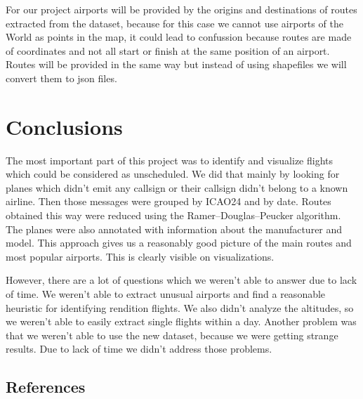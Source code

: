 \documentclass{vldb}
\begin{document}
For our project airports will be provided by the origins and 
destinations of routes extracted from the dataset, because 
for this case we cannot use airports of the World as points in the map, it could lead to confussion
because routes are made of coordinates and not all start or finish at the same position of an airport. 
Routes will be provided in the same way but instead of using shapefiles we will convert them to json files.


\section{Conclusions}
The most important part of this project was to identify 
and visualize flights which could be considered as unscheduled. 
We did that mainly by looking for planes which didn’t emit any 
callsign or their callsign didn’t belong to a known airline. 
Then those messages were grouped by ICAO24 and by date. 
Routes obtained this way were reduced using the Ramer–Douglas–Peucker algorithm. 
The planes were also annotated with information 
about the manufacturer and model. 
This approach gives us a reasonably good picture of the main routes and most popular airports. 
This is clearly visible on visualizations.

However, there are a lot of questions which we weren’t 
able to answer due to lack of time. We weren't able to extract 
unusual airports and find a reasonable heuristic for identifying 
rendition flights. We also didn’t analyze the altitudes, so we 
weren’t able to easily extract single flights within a day. 
Another problem was that we weren’t able to use the new 
dataset, because we were getting strange results. 
Due to lack of time we didn’t address those problems.





\subsection{References}
\end{document}
